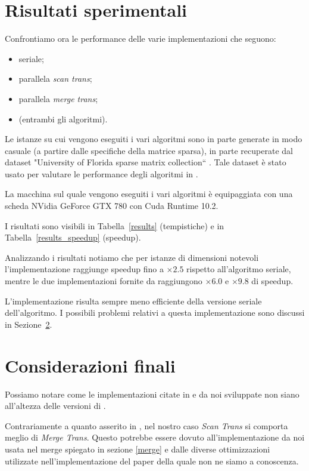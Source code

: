 

\section{Risultati sperimentali}

Confrontiamo ora le performance delle varie implementazioni che seguono:
\begin{itemize}
    \item seriale;
    \item parallela \emph{scan trans};
    \item parallela \emph{merge trans};
    \item \cuSPARSE (entrambi gli algoritmi).
\end{itemize}

Le istanze su cui vengono eseguiti i vari algoritmi sono in parte generate in modo casuale (a partire dalle specifiche della matrice sparsa), in parte recuperate dal dataset "University  of Florida sparse  matrix collection`` \cite{dataset}. Tale dataset è stato usato per valutare le performance degli algoritmi in \cite{parallelTrans}.

La macchina sul quale vengono eseguiti i vari algoritmi è equipaggiata con una scheda NVidia GeForce GTX 780 con Cuda Runtime 10.2.

I risultati sono visibili in Tabella~\ref{results} (tempistiche) e in Tabella~\ref{results_speedup} (speedup).

Analizzando i risultati notiamo che per istanze di dimensioni notevoli l'implementazione \ScanTrans{} raggiunge speedup fino a $\times 2.5$ rispetto all'algoritmo seriale, mentre le due implementazioni fornite da \cuSPARSE{} raggiungono $\times 6.0$ e $\times 9.8$ di speedup. 

L'implementazione \MergeTrans{} risulta sempre meno efficiente della versione seriale dell'algoritmo. I possibili problemi relativi a questa implementazione sono discussi in Sezione~\ref{conclusioni}.





\section{Considerazioni finali}\label{conclusioni}

Possiamo notare come le implementazioni citate in \cite{parallelTrans} e da noi sviluppate non siano all'altezza delle versioni di \cuSPARSE.

Contrariamente a quanto asserito in \cite{parallelTrans}, nel nostro caso \textit{Scan Trans} si comporta meglio di \textit{Merge Trans}. Questo potrebbe essere dovuto all'implementazione da noi usata nel merge spiegato in sezione \ref{merge} e dalle diverse ottimizzazioni utilizzate nell'implementazione del paper della quale non ne siamo a conoscenza.

